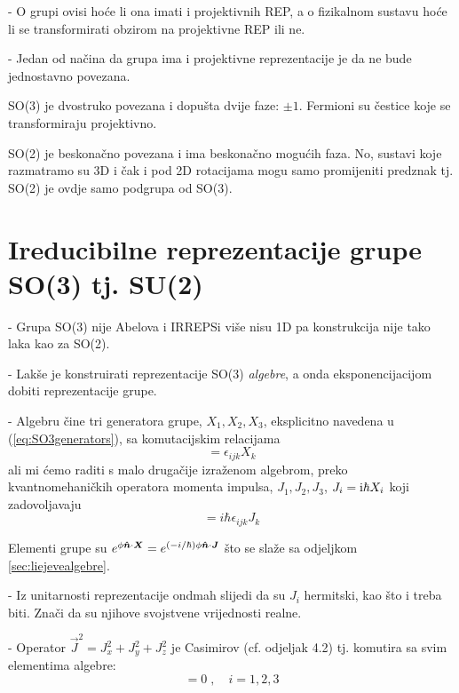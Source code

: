 - O grupi ovisi hoće li ona imati i projektivnih REP, a o fizikalnom
sustavu hoće li se transformirati obzirom na projektivne REP ili ne.

- Jedan od načina da grupa ima i projektivne reprezentacije je da
  ne bude jednostavno povezana.

SO(3) je dvostruko povezana i dopušta dvije faze: $\pm 1$. Fermioni
su čestice koje se transformiraju projektivno.

SO(2) je beskonačno povezana i ima beskonačno mogućih faza. No, sustavi
koje razmatramo su 3D i čak i pod 2D rotacijama mogu samo promijeniti
predznak tj. SO(2) je ovdje samo podgrupa od SO(3).

\section{Ireducibilne reprezentacije grupe SO(3) tj. SU(2)}

- Grupa SO(3) nije Abelova i IRREPSi više nisu 1D pa konstrukcija nije
tako laka kao za SO(2).

- Lakše je konstruirati reprezentacije SO(3) \emph{algebre}, a onda
  eksponencijacijom dobiti reprezentacije grupe.

- Algebru čine tri generatora grupe, $X_1, X_2, X_3$, eksplicitno navedena u
(\ref{eq:SO3generators}), sa komutacijskim relacijama
\begin{equation}
          [X_i, X_j] = \epsilon_{ijk} X_k
\end{equation}
ali mi ćemo raditi s malo drugačije izraženom algebrom, preko kvantnomehaničkih operatora
momenta impulsa, $J_1, J_2, J_3$, $J_i=\textrm{i} \hbar X_i$ koji zadovoljavaju
\begin{equation}
          [J_i, J_j] = i \hbar \epsilon_{ijk} J_k
\label{eq:SU2algebra}
\end{equation}
 
Elementi grupe su $e^{\phi\unitn\cdot\vec{X}}=e^{(-i/\hbar)\phi\unitn\cdot
 \vec{J}}$ što se slaže sa odjeljkom \ref{sec:liejevealgebre}.

- Iz unitarnosti reprezentacije ondmah slijedi da su $J_i$ hermitski, kao
  što i treba biti. Znači da su njihove svojstvene vrijednosti realne.

- Operator $\vec{J}^2 = J_{x}^2 + J_{y}^2 + J_{z}^2$ je Casimirov
  (cf. odjeljak 4.2) tj. komutira sa svim elementima algebre:
\begin{equation}
   [\jsq, J_{i}^2]=0\;, \quad i=1,2,3
\end{equation}

